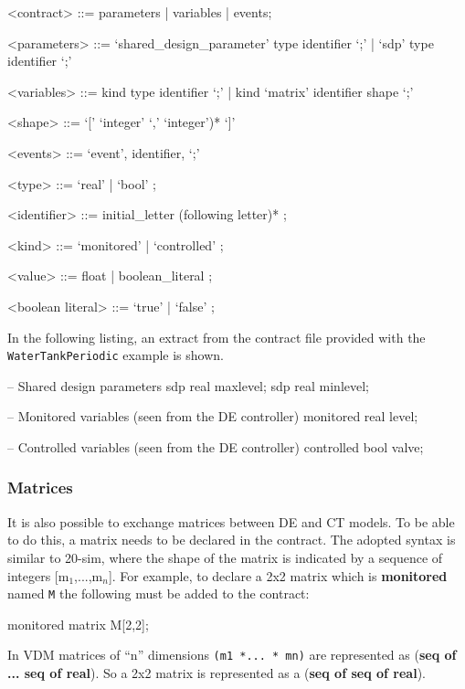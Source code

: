 \documentclass{crescendorepchap}
\newcommand{\vdmkeyw}[1]{{\bf\ttfamily #1}}
\begin{document}
\begin{grammar}
<contract> ::= parameters | variables | events;

<parameters> ::= `shared\_design\_parameter' type identifier `;'
             |   `sdp' type identifier `;'

<variables> ::= kind type identifier `;' 
            |   kind `matrix' identifier shape `;'

<shape> ::= `[' `integer' `,' `integer')* `]' 

<events> ::= `event', identifier, `;'

<type> ::= `real' | `bool' ;

<identifier> ::= initial\_letter (following letter)* ;

<kind> ::= `monitored' | `controlled' ;

<value> ::= float | boolean\_literal ;

<boolean literal> ::= `true' | `false' ;
\end{grammar}

In the following listing, an extract from the contract file provided
with the \texttt{WaterTankPeriodic} example is shown.

\begin{dcl}
-- Shared design parameters
sdp real maxlevel;
sdp real minlevel; 

-- Monitored variables (seen from the DE controller)
monitored real level;

-- Controlled variables (seen from the DE controller)
controlled bool valve; 
\end{dcl}

\subsubsection{Matrices}

It is also possible to exchange matrices
between DE and CT models. To be able to do this, a matrix needs to be
declared in the contract. The adopted syntax is similar to 20-sim, where
the shape of the matrix is indicated by a sequence of integers
{[}m$_1$,...,m$_n${]}. For example, to declare
a 2x2 matrix which is \vdmkeyw{monitored} named \texttt{M} the following must be
added to the contract:

\begin{dcl}
monitored matrix M[2,2];
\end{dcl}

In VDM matrices of ``n'' dimensions
\texttt{(m1 *... * mn)} are
represented as (\vdmkeyw{seq of ... seq of real}). So a 2x2 matrix is
represented as a (\vdmkeyw{seq of seq of
real}).
\end{document}
